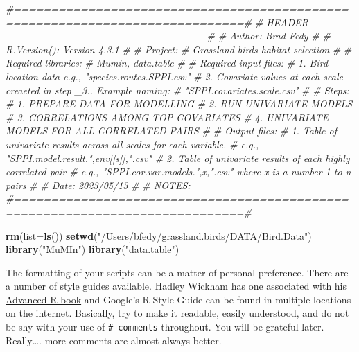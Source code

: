 \documentclass[
]{book}
\newenvironment{Shaded}{\begin{snugshade}}{\end{snugshade}}
\newcommand{\AttributeTok}[1]{\textcolor[rgb]{0.13,0.29,0.53}{#1}}
\newcommand{\CommentTok}[1]{\textcolor[rgb]{0.56,0.35,0.01}{\textit{#1}}}
\newcommand{\FunctionTok}[1]{\textcolor[rgb]{0.13,0.29,0.53}{\textbf{#1}}}
\newcommand{\NormalTok}[1]{#1}
\newcommand{\StringTok}[1]{\textcolor[rgb]{0.31,0.60,0.02}{#1}}
\begin{document}
\begin{Shaded}
\begin{Highlighting}[]
\CommentTok{\#=============================================================================\#}
\CommentTok{\# HEADER {-}{-}{-}{-}{-}{-}{-}{-}{-}{-}{-}{-}{-}{-}{-}{-}{-}{-}{-}{-}{-}{-}{-}{-}{-}{-}{-}{-}{-}{-}{-}{-}{-}{-}{-}{-}{-}{-}{-}{-}{-}{-}{-}{-}{-}{-}{-}{-}{-}{-}{-}{-}{-}{-}{-}{-}{-}{-}{-}{-}{-}{-}{-}{-}{-}{-}{-}{-}{-}}
\CommentTok{\#}
\CommentTok{\#  Author: Brad Fedy}
\CommentTok{\#}
\CommentTok{\#  R.Version(): Version 4.3.1}
\CommentTok{\#}
\CommentTok{\#  Project: }
\CommentTok{\#  Grassland birds habitat selection}
\CommentTok{\#}
\CommentTok{\#  Required libraries: }
\CommentTok{\#  Mumin, data.table}
\CommentTok{\# }
\CommentTok{\#  Required input files: }
\CommentTok{\#  1. Bird location data e.g., "species.routes.SPPI.csv"}
\CommentTok{\#  2. Covariate values at each scale creaeted in step \_3.. Example naming:}
\CommentTok{\#     "SPPI.covariates.\textasciigrave{}scale\textquotesingle{}.csv"}
\CommentTok{\#}
\CommentTok{\#  Steps:}
\CommentTok{\#  1. PREPARE DATA FOR MODELLING}
\CommentTok{\#  2. RUN UNIVARIATE MODELS}
\CommentTok{\#  3. CORRELATIONS AMONG TOP COVARIATES}
\CommentTok{\#  4. UNIVARIATE MODELS FOR ALL CORRELATED PAIRS}
\CommentTok{\#}
\CommentTok{\#  Output files: }
\CommentTok{\#  1. Table of univariate results across all scales for each variable. }
\CommentTok{\#     e.g., "SPPI.model.result.",env[[s]],".csv"}
\CommentTok{\#  2.  Table of univariate results of each highly correlated pair}
\CommentTok{\#     e.g., "SPPI.cor.var.models.",x,".csv" where \textasciigrave{}x\textquotesingle{} is a number 1 to n pairs}
\CommentTok{\#}
\CommentTok{\#  Date: 2023/05/13}
\CommentTok{\#}
\CommentTok{\#  NOTES: }
\CommentTok{\#=============================================================================\#}

\FunctionTok{rm}\NormalTok{(}\AttributeTok{list=}\FunctionTok{ls}\NormalTok{())}
\FunctionTok{setwd}\NormalTok{(}\StringTok{"/Users/bfedy/grassland.birds/DATA/Bird.Data"}\NormalTok{)}
\FunctionTok{library}\NormalTok{(}\StringTok{"MuMIn"}\NormalTok{)}
\FunctionTok{library}\NormalTok{(}\StringTok{"data.table"}\NormalTok{)}
\end{Highlighting}
\end{Shaded}

The formatting of your scripts can be a matter of personal preference. There are a number of style guides available. Hadley Wickham has one associated with his \href{http://adv-r.had.co.nz/Style.html}{Advanced R book} and Google's R Style Guide can be found in multiple locations on the internet. Basically, try to make it readable, easily understood, and do not be shy with your use of \texttt{\#\ comments} throughout. You will be grateful later. Really\ldots. more comments are almost always better.
\end{document}
